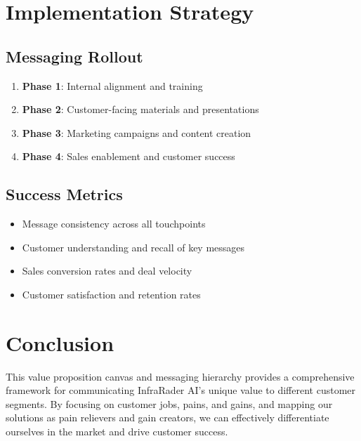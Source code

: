 \documentclass[business]{../templates/infraradar-main}
\begin{document}
\section{Implementation Strategy}

\subsection{Messaging Rollout}
\begin{enumerate}
    \item \textbf{Phase 1}: Internal alignment and training
    \item \textbf{Phase 2}: Customer-facing materials and presentations
    \item \textbf{Phase 3}: Marketing campaigns and content creation
    \item \textbf{Phase 4}: Sales enablement and customer success
\end{enumerate}

\subsection{Success Metrics}
\begin{itemize}
    \item Message consistency across all touchpoints
    \item Customer understanding and recall of key messages
    \item Sales conversion rates and deal velocity
    \item Customer satisfaction and retention rates
\end{itemize}

\section{Conclusion}

This value proposition canvas and messaging hierarchy provides a comprehensive framework for communicating InfraRader AI's unique value to different customer segments. By focusing on customer jobs, pains, and gains, and mapping our solutions as pain relievers and gain creators, we can effectively differentiate ourselves in the market and drive customer success.
\end{document}
